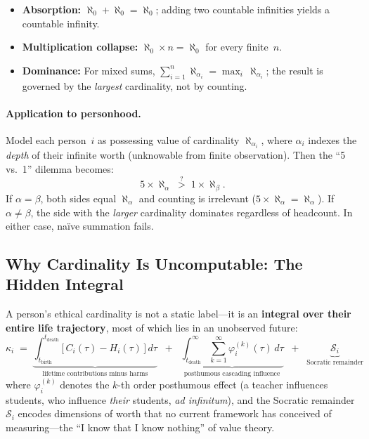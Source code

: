 \documentclass[11pt]{article}
\begin{document}
\begin{itemize}
    \item \textbf{Absorption:}
          $\aleph_0 + \aleph_0 = \aleph_0$; adding two countable infinities
          yields a countable infinity.
    \item \textbf{Multiplication collapse:}
          $\aleph_0 \times n = \aleph_0$ for every finite~$n$.
    \item \textbf{Dominance:}
          For mixed sums,
          $\sum_{i=1}^{n}\aleph_{\alpha_i} = \max_i\,\aleph_{\alpha_i}$;
          the result is governed by the \emph{largest} cardinality, not by
          counting.
\end{itemize}

\paragraph{Application to personhood.}
Model each person~$i$ as possessing value of cardinality
$\aleph_{\alpha_i}$, where $\alpha_i$ indexes the \emph{depth} of their
infinite worth (unknowable from finite observation). Then the ``5 vs.\ 1''
dilemma becomes:
\[
    5 \times \aleph_{\alpha} \;\stackrel{?}{>}\; 1 \times \aleph_{\beta}.
\]
If $\alpha = \beta$, both sides equal $\aleph_\alpha$ and counting is
irrelevant ($5 \times \aleph_\alpha = \aleph_\alpha$). If
$\alpha \neq \beta$, the side with the \emph{larger} cardinality dominates
regardless of headcount. In either case, na\"ive summation fails.

\subsection{Why Cardinality Is Uncomputable: The Hidden Integral}

A person's ethical cardinality is not a static label---it is an
\textbf{integral over their entire life trajectory}, most of which
lies in an unobserved future:
\[
  \kappa_i \;=\;
  \underbrace{\int_{t_{\mathrm{birth}}}^{t_{\mathrm{death}}}
    \bigl[\,C_i(\tau) - H_i(\tau)\,\bigr]\,d\tau}_{\text{lifetime
    contributions minus harms}}
  \;\;+\;\;
  \underbrace{\int_{t_{\mathrm{death}}}^{\infty}
    \sum_{k=1}^{\infty}\varphi_i^{(k)}(\tau)\,d\tau}_{\text{posthumous
    cascading influence}}
  \;\;+\;\;
  \underbrace{\mathcal{S}_i}_{\text{Socratic remainder}}
\]
where $\varphi_i^{(k)}$ denotes the $k$-th order posthumous effect
(a teacher influences students, who influence \emph{their} students,
\emph{ad infinitum}), and the Socratic remainder~$\mathcal{S}_i$
encodes dimensions of worth that no current framework has conceived
of measuring---the ``I know that I know nothing'' of value theory.
\end{document}
